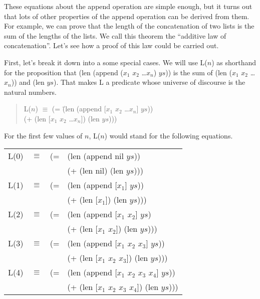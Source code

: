 These equations about the append operation are simple enough,
but it turns out that lots of other properties of the
append operation can be derived from them.
For example, we can prove that the length of
the concatenation of two lists is the sum of the lengths of the lists.
We call this theorem the ``additive law of concatenation''.
Let's see how a proof of this law could be carried out.

First, let's break it down into a some special cases.
We will use L($n$) as shorthand for the proposition that
(len (append ($x_1$ $x_2$ \dots $x_n$) $ys$))
is the sum of (len ($x_1$ $x_2$ \dots $x_n$)) and (len $ys$).
That makes L a predicate whose universe of discourse is
the natural numbers.

\label{additive-concat-law-predicate}
\begin{quote}
\begin{tabbing}
L($n$) $\equiv$ (= \=(len (append [$x_1$ $x_2$ \dots $x_n$] $ys$))  \\
                   \>(+ (len [$x_1$ $x_2$ \dots $x_n$]) (len $ys$)))
\end{tabbing}
\end{quote}

For the first few values of $n$, L($n$) would stand for the following equations.

\begin{center}
\begin{tabular}{llll}
L(0) & $\equiv$ & (= &(len (append nil $ys$)) \\
     &          &    &(+ (len nil) (len $ys$))) \\
L(1) & $\equiv$ & (= &(len (append [$x_1$] $ys$)) \\
     &          &    &(+ (len [$x_1$]) (len $ys$))) \\
L(2) & $\equiv$ & (= &(len (append [$x_1$ $x_2$] $ys$) 	\\
	 &          &    &(+ (len [$x_1$ $x_2$]) (len $ys$))) \\
L(3) & $\equiv$ & (= &(len (append [$x_1$ $x_2$ $x_3$] $ys$)) \\
     &          &    &(+ (len [$x_1$ $x_2$ $x_3$]) (len $ys$))) \\
L(4) & $\equiv$ & (= &(len (append [$x_1$ $x_2$ $x_3$ $x_4$] $ys$)) \\
     &          &    &(+ (len [$x_1$ $x_2$ $x_3$ $x_4$]) (len $ys$)))
\end{tabular}
\end{center}


